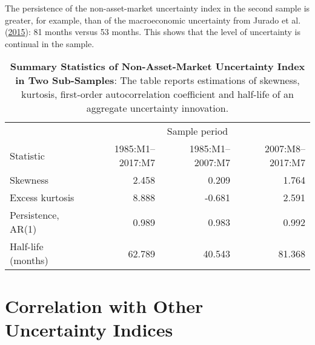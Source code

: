 \documentclass[12pt,twoside]{reedthesis}
\begin{document}
The persistence of the non-asset-market uncertainty index in the second sample is greater, for example, than of the macroeconomic uncertainty from Jurado et al. (\protect\hyperlink{ref-juraetal:2015}{2015}): 81 months versus 53 months. This shows that the level of uncertainty is continual in the sample.


\begin{table}

\caption[Summary Statistics of Non-Asset-Market Uncertainty Index in Two Sub-Samples]{\label{tab:summary-table}\textbf{Summary Statistics of Non-Asset-Market Uncertainty Index in Two Sub-Samples}: The table reports estimations of skewness, kurtosis, first-order autocorrelation coefficient and half-life of an aggregate uncertainty innovation.}
\centering
\begin{tabular}[t]{lrrr}
\toprule
\multicolumn{1}{c}{} & \multicolumn{3}{c}{Sample period} \\
\cmidrule(l{3pt}r{3pt}){2-4}
Statistic & 1985:M1--2017:M7 & 1985:M1--2007:M7 & 2007:M8--2017:M7\\
\midrule
Skewness & 2.458 & 0.209 & 1.764\\
Excess kurtosis & 8.888 & -0.681 & 2.591\\
Persistence, AR(1) & 0.989 & 0.983 & 0.992\\
Half-life (months) & 62.789 & 40.543 & 81.368\\
\bottomrule
\end{tabular}
\end{table}
\hypertarget{correlation-with-uncertainty-indices}{%
\section{Correlation with Other Uncertainty Indices}\label{correlation-with-uncertainty-indices}}
\end{document}
